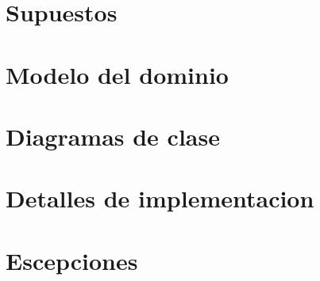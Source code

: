 


		
	
	\newpage

	\tableofcontents
	\newpage

	\graphicspath{{../docs/report/pics/}}

	\section{Supuestos}
		

	\newpage
	\section{Modelo del dominio}
		

	\newpage
	\section{Diagramas de clase}
		

	\newpage
	\section{Detalles de implementacion}
		

	\newpage
	\section{Escepciones}
		

